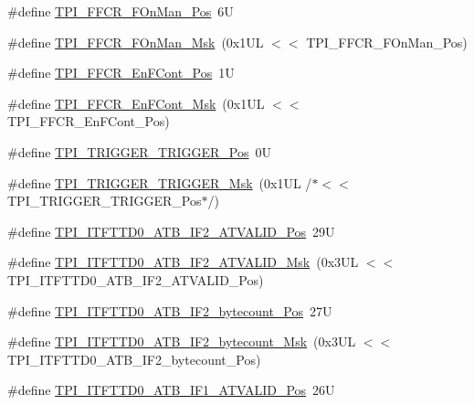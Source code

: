 \begin{DoxyCompactItemize}
\#define \hyperlink{group___c_m_s_i_s___t_p_i_gac57b0b588a37a870573560bc6316cbcc}{T\+P\+I\+\_\+\+F\+F\+C\+R\+\_\+\+F\+On\+Man\+\_\+\+Pos}~6U
\item 
\#define \hyperlink{group___c_m_s_i_s___t_p_i_ga7aeb30af62d04e852a55c3bd64c1bd2c}{T\+P\+I\+\_\+\+F\+F\+C\+R\+\_\+\+F\+On\+Man\+\_\+\+Msk}~(0x1\+U\+L $<$$<$ T\+P\+I\+\_\+\+F\+F\+C\+R\+\_\+\+F\+On\+Man\+\_\+\+Pos)
\item 
\#define \hyperlink{group___c_m_s_i_s___t_p_i_ga99e58a0960b275a773b245e2b69b9a64}{T\+P\+I\+\_\+\+F\+F\+C\+R\+\_\+\+En\+F\+Cont\+\_\+\+Pos}~1U
\item 
\#define \hyperlink{group___c_m_s_i_s___t_p_i_ga27d1ecf2e0ff496df03457a2a97cb2c9}{T\+P\+I\+\_\+\+F\+F\+C\+R\+\_\+\+En\+F\+Cont\+\_\+\+Msk}~(0x1\+U\+L $<$$<$ T\+P\+I\+\_\+\+F\+F\+C\+R\+\_\+\+En\+F\+Cont\+\_\+\+Pos)
\item 
\#define \hyperlink{group___c_m_s_i_s___t_p_i_ga5517fa2ced64efbbd413720329c50b99}{T\+P\+I\+\_\+\+T\+R\+I\+G\+G\+E\+R\+\_\+\+T\+R\+I\+G\+G\+E\+R\+\_\+\+Pos}~0U
\item 
\#define \hyperlink{group___c_m_s_i_s___t_p_i_ga814227af2b2665a0687bb49345e21110}{T\+P\+I\+\_\+\+T\+R\+I\+G\+G\+E\+R\+\_\+\+T\+R\+I\+G\+G\+E\+R\+\_\+\+Msk}~(0x1\+U\+L /$\ast$$<$$<$ T\+P\+I\+\_\+\+T\+R\+I\+G\+G\+E\+R\+\_\+\+T\+R\+I\+G\+G\+E\+R\+\_\+\+Pos$\ast$/)
\item 
\#define \hyperlink{group___c_m_s_i_s___t_p_i_gab268401221645f4e0e1a82d1d6c2caee}{T\+P\+I\+\_\+\+I\+T\+F\+T\+T\+D0\+\_\+\+A\+T\+B\+\_\+\+I\+F2\+\_\+\+A\+T\+V\+A\+L\+I\+D\+\_\+\+Pos}~29U
\item 
\#define \hyperlink{group___c_m_s_i_s___t_p_i_gac6fc2d04903210afe2599482a72e0a25}{T\+P\+I\+\_\+\+I\+T\+F\+T\+T\+D0\+\_\+\+A\+T\+B\+\_\+\+I\+F2\+\_\+\+A\+T\+V\+A\+L\+I\+D\+\_\+\+Msk}~(0x3\+U\+L $<$$<$ T\+P\+I\+\_\+\+I\+T\+F\+T\+T\+D0\+\_\+\+A\+T\+B\+\_\+\+I\+F2\+\_\+\+A\+T\+V\+A\+L\+I\+D\+\_\+\+Pos)
\item 
\#define \hyperlink{group___c_m_s_i_s___t_p_i_gadaa8bfec760711c2d190d5fd124706fe}{T\+P\+I\+\_\+\+I\+T\+F\+T\+T\+D0\+\_\+\+A\+T\+B\+\_\+\+I\+F2\+\_\+bytecount\+\_\+\+Pos}~27U
\item 
\#define \hyperlink{group___c_m_s_i_s___t_p_i_ga8b342379b5d45d46459807859a8a6687}{T\+P\+I\+\_\+\+I\+T\+F\+T\+T\+D0\+\_\+\+A\+T\+B\+\_\+\+I\+F2\+\_\+bytecount\+\_\+\+Msk}~(0x3\+U\+L $<$$<$ T\+P\+I\+\_\+\+I\+T\+F\+T\+T\+D0\+\_\+\+A\+T\+B\+\_\+\+I\+F2\+\_\+bytecount\+\_\+\+Pos)
\item 
\#define \hyperlink{group___c_m_s_i_s___t_p_i_ga0b95f6b474fe2e4b7ba9963b00d18258}{T\+P\+I\+\_\+\+I\+T\+F\+T\+T\+D0\+\_\+\+A\+T\+B\+\_\+\+I\+F1\+\_\+\+A\+T\+V\+A\+L\+I\+D\+\_\+\+Pos}~26U

\end{DoxyCompactItemize}

